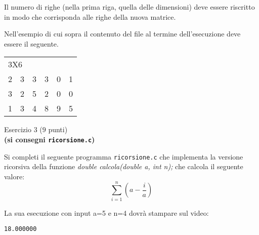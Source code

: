 \documentclass[12pt]{article}
\begin{document}
Il numero di righe (nella prima riga, quella delle dimensioni) deve essere riscritto in modo che corrisponda alle righe della nuova matrice.

Nell’esempio di cui sopra il contenuto del file al termine dell’esecuzione deve essere il seguente.\\

\begin{tabular}{llllll}
\multicolumn{3}{l}{3X6}&&&\\
2& 3& 3& 3& 0& 1\\ 
3& 2& 5& 2& 0& 0\\
1& 3& 4& 8& 9& 5\\
\end{tabular}


\vspace{8ex}
\begin{center}{\Large Esercizio 3} ($9$ punti)\\
  \textbf{(si consegni \texttt{ricorsione.c})}
\end{center}
Si completi il seguente programma \texttt{ricorsione.c} che implementa la versione ricorsiva della funzione \emph{double  calcola(double a, int n);} che calcola il seguente valore: \[ \sum_{i=1}^{n}(a - \frac{i}{a}) \]

%
La sua esecuzione con input a=5 e n=4 dovr\`a stampare sul video:
\begin{mdframed}[backgroundcolor=lightgrey] 
\begin{verbatim}
18.000000
\end{verbatim}
\end{mdframed}
\end{document}
